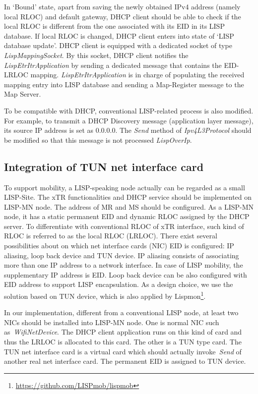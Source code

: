 In `Bound' state, apart from saving the newly obtained IPv4 address (namely local RLOC) and default gateway, DHCP client should be able to check if the local RLOC is different from the one associated with its EID in its LISP database.
If local RLOC is changed, DHCP client enters into state of `LISP database update'. DHCP client is equipped with a dedicated socket of type \emph{LispMappingSocket}. By this socket, DHCP client notifies the \emph{LispEtrItrApplication} by sending a dedicated message that contains the EID-LRLOC mapping. \emph{LispEtrItrApplication} is in charge of populating the received mapping entry into LISP database and sending a Map-Register message to the Map Server.

To be compatible with DHCP, conventional LISP-related process is also modified. For example, to transmit a DHCP Discovery message (application layer message), its source IP address is set as $0.0.0.0$. The \emph{Send} method of \emph{Ipv4L3Protocol} should be modified so that this message is not processed \emph{LispOverIp}.

\subsection{Integration of TUN net interface card}
\label{subsec:tundevice}
To support mobility, a LISP-speaking node actually can be regarded as a small LISP-Site. The xTR functionalities and DHCP service should be implemented on LISP-MN node. The address of MR and MS should be configured. As a LISP-MN node, it has a static permanent EID and dynamic RLOC assigned by the DHCP server. To differentiate with conventional RLOC of xTR interface, such kind of RLOC is referred to as the local RLOC (LRLOC). There exist several possibilities about on which net interface cards (NIC) EID is configured: IP aliasing, loop back device and TUN device. IP aliasing consists of associating more than one IP address to a network interface. In case of LISP mobility, the supplementary IP address is EID. Loop back device can be also configured with EID address to support LISP encapsulation. As a design choice, we use the solution based on TUN device, which is also applied by Lispmon\footnote{\url{https://github.com/LISPmob/lispmob}}.

In our implementation, different from a conventional LISP node, at least two NICs should be installed into LISP-MN node. One is normal NIC such as~\emph{WifiNetDevice}. The DHCP client application runs on this kind of card and thus the LRLOC is allocated to this card. The other is a TUN type card. The TUN net interface card is a virtual card which should actually invoke~\emph{Send} of another real net interface card. The permanent EID is assigned to TUN device. 

